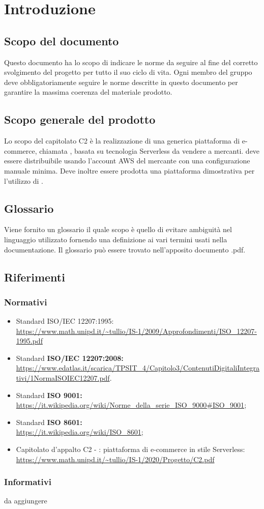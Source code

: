 
\section{Introduzione}
\subsection{Scopo del documento}
Questo documento ha lo scopo di indicare le norme da seguire al fine del corretto svolgimento del progetto per tutto il suo ciclo di vita. 
Ogni membro del gruppo \Omicron{} deve obbligatoriamente seguire le norme descritte in questo documento per garantire la massima coerenza del materiale prodotto.

\subsection{Scopo generale del prodotto}
Lo scopo del capitolato C2 è la realizzazione di una generica piattaforma di e-commerce, chiamata \nameproject{}, basata su tecnologia Serverless da vendere a mercanti. \nameproject{} deve essere distribuibile usando l'account AWS del mercante con una configurazione manuale minima. Deve inoltre essere prodotta una piattaforma dimostrativa per l'utilizzo di \nameproject{}.   

\subsection{Glossario}
Viene fornito un glossario il quale scopo è quello di evitare ambiguità nel linguaggio utilizzato fornendo una definizione ai vari termini usati nella documentazione. Il glossario può essere trovato nell'apposito documento \Glossario{}.pdf.

\subsection{Riferimenti}
\subsubsection{Normativi}
\begin{itemize}
\item Standard ISO/IEC 12207:1995:\\ \url{https://www.math.unipd.it/~tullio/IS-1/2009/Approfondimenti/ISO_12207-1995.pdf}
\item Standard \textbf{ISO/IEC 12207:2008: }\\ \url{https://www.edatlas.it/scarica/TPSIT_4/Capitolo3/ContenutiDigitaliIntegrativi/1NormaISOIEC12207.pdf}.
\item Standard \textbf{ISO 9001: }\\ \url{https://it.wikipedia.org/wiki/Norme_della_serie_ISO_9000#ISO_9001};
\item Standard \textbf{ISO 8601: }\\ \url{https://it.wikipedia.org/wiki/ISO_8601};
\item Capitolato d'appalto C2 - \nameproject{}: piattaforma di e-commerce in stile Serverless:\\ \url{https://www.math.unipd.it/~tullio/IS-1/2020/Progetto/C2.pdf}
\end{itemize}

\subsubsection{Informativi}
da aggiungere